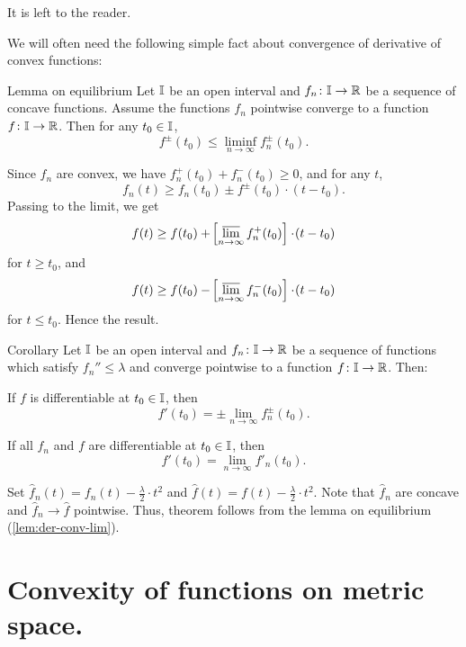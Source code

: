  It is left to the reader.\qeds


We will often need the following simple fact about convergence of derivative of convex functions:

\begin{thm}{Lemma on equilibrium}\label{lem:der-conv-lim}
Let $\mathbb{I}$ be an open interval 
and $f_n\:\II\to\RR$ be a sequence of concave functions. 
Assume the functions $f_n$ pointwise converge to a function $f\:\II\to\RR$.
Then for any $t_0\in \II$,
\[f^\pm(t_0)\le \liminf_{n\to\infty}f^\pm_n(t_0).\]
\end{thm}

Since $f_n$ are convex, we have $f^+_n(t_0)+f^-_n(t_0)\ge0$, and for any $t$,
\[f_n(t)\ge f_n(t_0)\pm f^\pm(t_0)\cdot (t-t_0).\]
Passing to the limit, we get
\[f(t)\ge f(t_0)+\l[\limsup_{n\to\infty}f^+_n(t_0)\r]\cdot (t-t_0)\]
for $t\ge t_0$, and 
\[f(t)\ge f(t_0)-\l[\limsup_{n\to\infty}f^-_n(t_0)\r]\cdot (t-t_0)\]
for $t\le t_0$.
Hence the result.
\qeds

\begin{thm}{Corollary}
\label{cor:der-conv-lim}
Let $\mathbb{I}$ be an open interval 
and $f_n\:\II\to\RR$ be a sequence of functions which satisfy $f_n''\le \lambda$ and converge pointwise to a function $f\:\II\to\RR$.
Then: 
\begin{subthm}{} If $f$ is differentiable at $t_0\in \II$, then
\[f'(t_0)=\pm\lim_{n\to\infty} f^\pm_n(t_0).\]
\end{subthm}

\begin{subthm}{} If all $f_n$ and $f$ are differentiable at $t_0\in \II$, then
\[f'(t_0)=\lim_{n\to\infty} f'_n(t_0).\]
\end{subthm}
\end{thm}

 Set $\hat f_n(t)=f_n(t)-\tfrac{\lambda}{2}\cdot t^2$ and $\hat f(t)=f(t)-\tfrac\lambda2\cdot t^2$.
Note that $\hat f_n$ are concave and $\hat f_n\to \hat f$ pointwise.
Thus, theorem follows from the lemma on equilibrium (\ref{lem:der-conv-lim}).\qeds











\section{Convexity of functions on metric space.}\label{sec:conv-fun}

